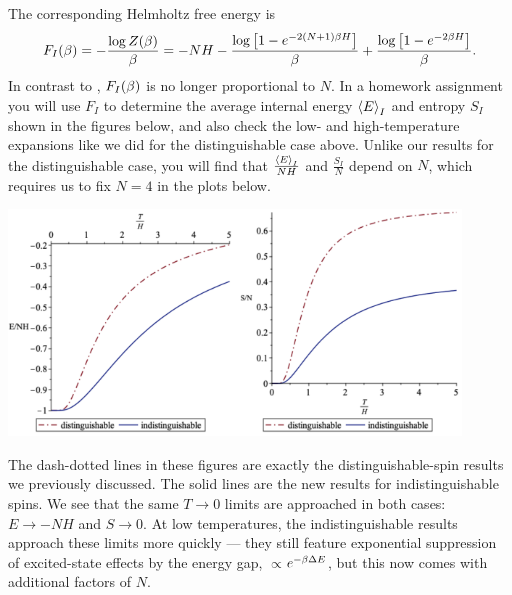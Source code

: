 The corresponding Helmholtz free energy is
\begin{equation}
  \label{eq:indist_Helm}
  F_I(\beta) = -\frac{\log Z(\beta)}{\beta} = -NH - \frac{\log\left[1 - e^{-2(N + 1) \beta H}\right]}{\beta} + \frac{\log\left[1 - e^{-2 \beta H}\right]}{\beta}.
\end{equation}
In contrast to , $F_I(\beta)$ is no longer proportional to $N$.
In a homework assignment you will use $F_I$ to determine the average internal energy $\left\langle E \right\rangle_I$ and entropy $S_I$ shown in the figures below, and also check the low- and high-temperature expansions like we did for the distinguishable case above.
Unlike our results for the distinguishable case, you will find that $\frac{\left\langle E \right\rangle_I}{NH}$ and $\frac{S_I}{N}$ depend on $N$, which requires us to fix $N = 4$ in the plots below.
\begin{center} %
  \includegraphics[width=0.45\textwidth]{figs/unit03_energies.pdf}\hfill \includegraphics[width=0.45\textwidth]{figs/unit03_entropies.pdf}
\end{center}

The dash-dotted lines in these figures are exactly the distinguishable-spin results we previously discussed.
The solid lines are the new results for indistinguishable spins.
We see that the same $T \to 0$ limits are approached in both cases: $E \to -NH$ and $S \to 0$.
At low temperatures, the indistinguishable results approach these limits more quickly --- they still feature exponential suppression of excited-state effects by the energy gap, $\propto$$e^{-\beta \Delta E}$, but this now comes with additional factors of $N$.

